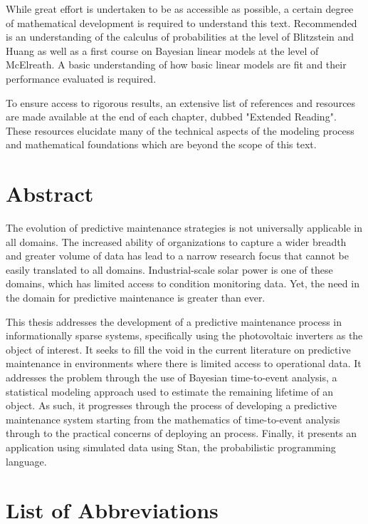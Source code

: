 While great effort is undertaken to be as accessible as possible, a certain degree of mathematical development is required to understand this text. Recommended is an understanding of the calculus of probabilities at the level of Blitzstein and Huang\cite{Blitzstein2014} as well as a first course on Bayesian linear models at the level of McElreath\cite{McElreath2016}. A basic understanding of how basic linear models are fit and their performance evaluated is required.

To ensure access to rigorous results, an extensive list of references and resources are made available at the end of each chapter, dubbed "Extended Reading". These resources elucidate many of the technical aspects of the modeling process and mathematical foundations which are beyond the scope of this text.

\newpage

\section*{Abstract}


The evolution of predictive maintenance strategies is not universally applicable in all domains. The increased ability of organizations to capture a wider breadth and greater volume of data has lead to a narrow research focus that cannot be easily translated to all domains. Industrial-scale solar power is one of these domains, which has limited access to condition monitoring data. Yet, the need in the domain for predictive maintenance is greater than ever.

This thesis addresses the development of a predictive maintenance process in informationally sparse systems, specifically using the photovoltaic inverters as the object of interest. It seeks to fill the void in the current literature on predictive maintenance in environments where there is limited access to operational data. It addresses the problem through the use of Bayesian time-to-event analysis, a statistical modeling approach used to estimate the remaining lifetime of an object. As such, it progresses through the process of developing a predictive maintenance system starting from the mathematics of time-to-event analysis through to the practical concerns of deploying an process. Finally, it presents an application using simulated data using Stan, the probabilistic programming language.

\section*{List of Abbreviations}

